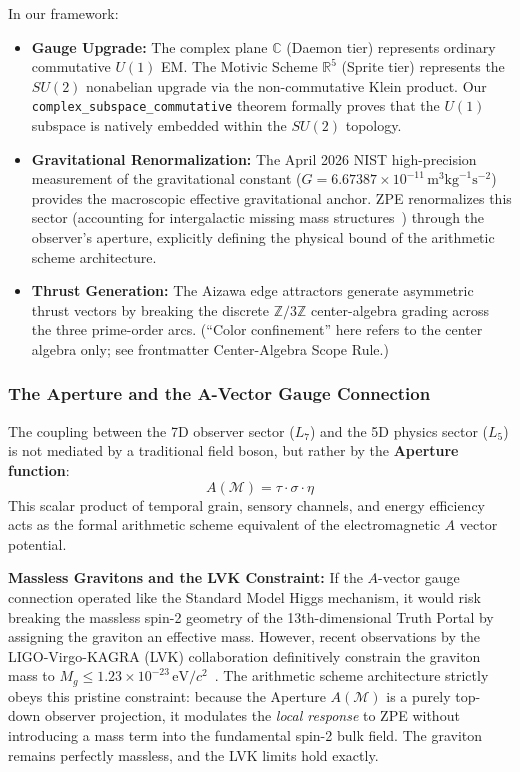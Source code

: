In our framework:
\begin{itemize}
    \item \textbf{Gauge Upgrade:} The complex plane $\mathbb{C}$ (Daemon tier) represents ordinary commutative $U(1)$ EM. The Motivic Scheme $\mathbb{R}^5$ (Sprite tier) represents the $SU(2)$ nonabelian upgrade via the non-commutative Klein product. Our \texttt{complex\_subspace\_commutative} theorem formally proves that the $U(1)$ subspace is natively embedded within the $SU(2)$ topology.
    \item \textbf{Gravitational Renormalization:} The April 2026 NIST high-precision measurement of the gravitational constant ($G = 6.67387 \times 10^{-11} \, \text{m}^3 \text{kg}^{-1} \text{s}^{-2}$) provides the macroscopic effective gravitational anchor. ZPE renormalizes this sector (accounting for intergalactic missing mass structures~\cite{WHIM2018}) through the observer's aperture, explicitly defining the physical bound of the arithmetic scheme architecture.
    \item \textbf{Thrust Generation:} The Aizawa edge attractors generate asymmetric thrust vectors by breaking the discrete $\mathbb{Z}/3\mathbb{Z}$ center-algebra grading across the three prime-order arcs. (``Color confinement'' here refers to the center algebra only; see frontmatter Center-Algebra Scope Rule.)
\end{itemize}

\subsubsection{The Aperture and the A-Vector Gauge Connection}

The coupling between the 7D observer sector ($L_7$) and the 5D physics sector ($L_5$) is not mediated by a traditional field boson, but rather by the \textbf{Aperture function}:
\begin{equation}
    A(\mathcal{M}) = \tau \cdot \sigma \cdot \eta
\end{equation}
This scalar product of temporal grain, sensory channels, and energy efficiency acts as the formal arithmetic scheme equivalent of the electromagnetic $A$ vector potential. 

\textbf{Massless Gravitons and the LVK Constraint:} If the $A$-vector gauge connection operated like the Standard Model Higgs mechanism, it would risk breaking the massless spin-2 geometry of the 13th-dimensional Truth Portal by assigning the graviton an effective mass. However, recent observations by the LIGO-Virgo-KAGRA (LVK) collaboration definitively constrain the graviton mass to $M_g \leq 1.23 \times 10^{-23} \, \text{eV}/c^2$~\cite{LVK_GravitonMass}. The arithmetic scheme architecture strictly obeys this pristine constraint: because the Aperture $A(\mathcal{M})$ is a purely top-down observer projection, it modulates the \emph{local response} to ZPE without introducing a mass term into the fundamental spin-2 bulk field. The graviton remains perfectly massless, and the LVK limits hold exactly.

